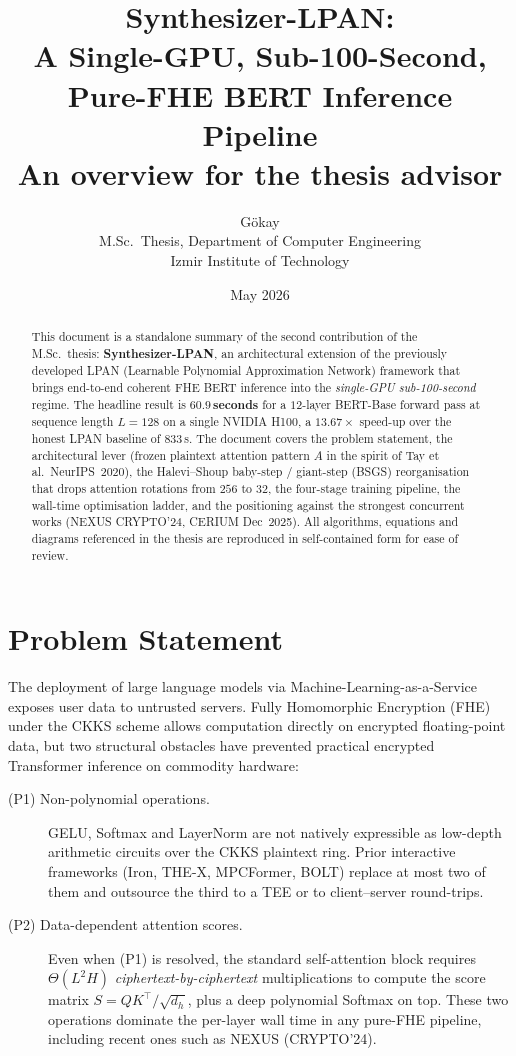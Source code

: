 \documentclass[11pt,a4paper]{article}
\title{\textbf{Synthesizer-LPAN}: \\
A Single-GPU, Sub-100-Second, Pure-FHE BERT Inference Pipeline \\
{\large An overview for the thesis advisor}}
\author{Gökay\\
\small M.Sc.\ Thesis, Department of Computer Engineering\\
\small Izmir Institute of Technology}
\date{May 2026}
\begin{document}
\maketitle

\begin{abstract}
\noindent This document is a standalone summary of the second contribution
of the M.Sc.\ thesis: \textbf{Synthesizer-LPAN}, an architectural extension
of the previously developed LPAN (Learnable Polynomial Approximation
Network) framework that brings end-to-end coherent FHE BERT inference
into the \emph{single-GPU sub-100-second} regime.  The headline result is
$\mathbf{60.9}$\,\textbf{seconds} for a $12$-layer BERT-Base forward pass at
sequence length $L{=}128$ on a single NVIDIA H100, a $\mathbf{13.67\times}$
speed-up over the honest LPAN baseline of $833$\,s.  The document covers
the problem statement, the architectural lever (frozen plaintext
attention pattern $A$ in the spirit of Tay et al.\ NeurIPS~2020), the
Halevi--Shoup baby-step / giant-step (BSGS) reorganisation that drops
attention rotations from $256$ to $32$, the four-stage training pipeline,
the wall-time optimisation ladder, and the positioning against the
strongest concurrent works (NEXUS CRYPTO'24, CERIUM Dec~2025).
All algorithms, equations and diagrams referenced in the thesis are
reproduced in self-contained form for ease of review.
\end{abstract}

\tableofcontents

\section{Problem Statement}

The deployment of large language models via Machine-Learning-as-a-Service
exposes user data to untrusted servers.  Fully Homomorphic Encryption
(FHE) under the CKKS scheme allows computation directly on encrypted
floating-point data, but two structural obstacles have prevented
practical encrypted Transformer inference on commodity hardware:

\begin{description}
  \item[(P1) Non-polynomial operations.]  GELU, Softmax and LayerNorm
  are not natively expressible as low-depth arithmetic circuits over the
  CKKS plaintext ring.  Prior interactive frameworks (Iron, THE-X,
  MPCFormer, BOLT) replace at most two of them and outsource the third
  to a TEE or to client--server round-trips.
  \item[(P2) Data-dependent attention scores.]  Even when (P1) is
  resolved, the standard self-attention block requires
  $\Theta(L^2 H)$ \emph{ciphertext-by-ciphertext} multiplications to
  compute the score matrix $S = QK^\top/\sqrt{d_h}$, plus a deep
  polynomial Softmax on top.  These two operations dominate the
  per-layer wall time in any pure-FHE pipeline, including recent ones
  such as NEXUS (CRYPTO'24).
\end{description}
\end{document}
